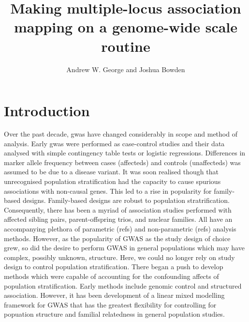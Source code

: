 \documentclass[12pt]{article}
\begin{document}
\title{Making multiple-locus association mapping on a genome-wide scale routine}
\author{Andrew W. George and Joshua Bowden}

\maketitle




\section{Introduction}

Over the past decade, gwas have changed 
considerably in scope and method of analysis. Early gwas were performed as case-control studies and their data analysed with simple
contingency table tests or logistic regressions.  Differences in marker allele frequency between cases (affecteds) and controls (unaffecteds) was assumed to be due to a disease variant. It was soon realised though that 
unrecognised population stratification had the capacity to cause spurious associations with non-causal genes. This led to a rise in 
popularity for family-based designs. Family-based designs are robust to population stratrification. 
Consequently, there has been a myriad of association studies performed with affected sibling pairs, 
parent-offspring trios, and nuclear families. All have an accompanying plethora of parametric (refs) and non-parametric (refs) analysis methods. However, as the popularity of GWAS as the study design of choice grew, so did the desire to perform GWAS in general 
populations which may have complex, possibly unknown, structure. Here, we could no longer rely on study design to control population stratification. There began a push to develop methods which were capable of accounting for the confounding affects of population 
stratification. Early methods include genomic control and structured association. However, it has been development of a linear mixed 
modelling framework for GWAS that has the greatest flexibility for controlling for popuation structure and familial relatedness in general population studies. 
\end{document}
